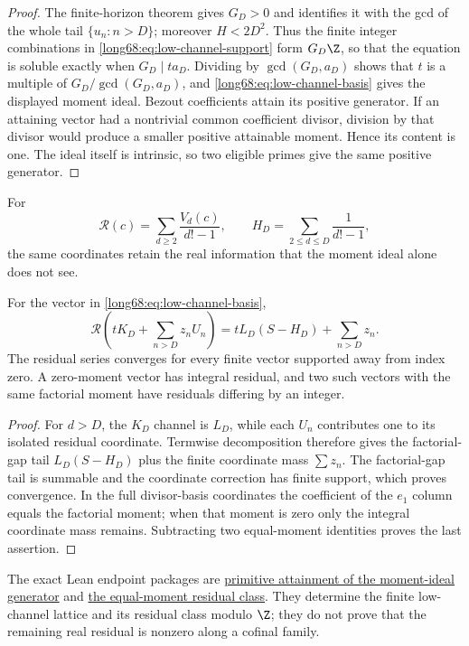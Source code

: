\documentclass[11pt]{article}
\newcommand{\Ser}{S}
\newcommand{\chn}[2]{V_{#1}(#2)}
\begin{document}
\begin{proof}
The finite-horizon theorem gives $G_D>0$ and identifies it with the gcd of the
whole tail $\{u_n:n>D\}$; moreover $H<2D^2$.  Thus the finite integer
combinations in \eqref{long68:eq:low-channel-support} form $G_D\Z$, so that the
equation is soluble exactly when $G_D\mid ta_D$.  Dividing by
$\gcd(G_D,a_D)$ shows that $t$ is a multiple of
$G_D/\gcd(G_D,a_D)$, and \eqref{long68:eq:low-channel-basis} gives the displayed
moment ideal.  Bezout coefficients attain its positive generator.  If an
attaining vector had a nontrivial common coefficient divisor, division by that
divisor would produce a smaller positive attainable moment.  Hence its content
is one.  The ideal itself is intrinsic, so two eligible primes give the same
positive generator.
\end{proof}

For
\[
 \mathcal R(c)=\sum_{d\ge2}\frac{\chn dc}{d!-1},\qquad
 H_D=\sum_{2\le d\le D}\frac1{d!-1},
\]
the same coordinates retain the real information that the moment ideal alone
does not see.

\begin{theorem}\label{long68:res:residual-transparency}
For the vector in \eqref{long68:eq:low-channel-basis},
\[
 \mathcal R\!\left(tK_D+\sum_{n>D}z_nU_n\right)
 =tL_D(\Ser-H_D)+\sum_{n>D}z_n.
\]
The residual series converges for every finite vector supported away from
index zero.  A zero-moment vector has integral residual, and two such vectors
with the same factorial moment have residuals differing by an integer.
\end{theorem}

\begin{proof}
For $d>D$, the $K_D$ channel is $L_D$, while each $U_n$ contributes one to its
isolated residual coordinate.  Termwise decomposition therefore gives the
factorial-gap tail $L_D(\Ser-H_D)$ plus the finite coordinate mass
$\sum z_n$.  The factorial-gap tail is summable and the coordinate correction
has finite support, which proves convergence.  In the full divisor-basis
coordinates the coefficient of the $e_1$ column equals the factorial moment;
when that moment is zero only the integral coordinate mass remains.  Subtracting
two equal-moment identities proves the last assertion.
\end{proof}

The exact Lean endpoint packages are
\href{https://github.com/wcook04/plectis-erdos/blob/f20f727ae44d6dc3b24036bf63118b8fe591912e/ErdosProblems/Erdos68/PaperCompleteMomentIdeal.lean#L242}{primitive attainment of the moment-ideal generator} and
\href{https://github.com/wcook04/plectis-erdos/blob/f20f727ae44d6dc3b24036bf63118b8fe591912e/ErdosProblems/Erdos68/PaperCompleteResidualIdentity.lean#L195}{the equal-moment residual class}.
They determine the finite low-channel lattice and its residual class modulo
$\Z$; they do not prove that the remaining real residual is nonzero along a
cofinal family.
\end{document}
